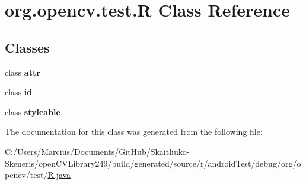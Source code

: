 \hypertarget{classorg_1_1opencv_1_1test_1_1_r}{}\section{org.\+opencv.\+test.\+R Class Reference}
\label{classorg_1_1opencv_1_1test_1_1_r}
\subsection*{Classes}
\begin{DoxyCompactItemize}
\item 
class {\bfseries attr}
\item 
class {\bfseries id}
\item 
class {\bfseries styleable}
\end{DoxyCompactItemize}


The documentation for this class was generated from the following file\+:\begin{DoxyCompactItemize}
\item 
C\+:/\+Users/\+Marcius/\+Documents/\+Git\+Hub/\+Skaitliuko-\/\+Skeneris/open\+C\+V\+Library249/build/generated/source/r/android\+Test/debug/org/opencv/test/\mbox{\hyperlink{android_test_2debug_2org_2opencv_2test_2_r_8java}{R.\+java}}\end{DoxyCompactItemize}

